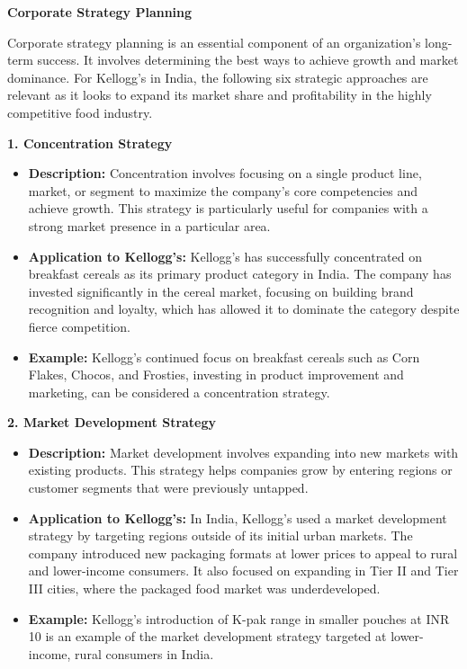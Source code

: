 \documentclass[10pt,a4paper]{book}
\begin{document}
\vspace{0.5cm}

\begin{center}
\textbf{Corporate Strategy Planning}
\end{center}

Corporate strategy planning is an essential component of an organization’s long-term success. It involves determining the best ways to achieve growth and market dominance. For Kellogg's in India, the following six strategic approaches are relevant as it looks to expand its market share and profitability in the highly competitive food industry.

\vspace{0.5cm}

\textbf{1. Concentration Strategy}
\begin{itemize}
    \item \textbf{Description:} Concentration involves focusing on a single product line, market, or segment to maximize the company’s core competencies and achieve growth. This strategy is particularly useful for companies with a strong market presence in a particular area.
    \item \textbf{Application to Kellogg's:} Kellogg's has successfully concentrated on breakfast cereals as its primary product category in India. The company has invested significantly in the cereal market, focusing on building brand recognition and loyalty, which has allowed it to dominate the category despite fierce competition.
    \item \textbf{Example:} Kellogg's continued focus on breakfast cereals such as Corn Flakes, Chocos, and Frosties, investing in product improvement and marketing, can be considered a concentration strategy.
\end{itemize}

\vspace{0.5cm}

\textbf{2. Market Development Strategy}
\begin{itemize}
    \item \textbf{Description:} Market development involves expanding into new markets with existing products. This strategy helps companies grow by entering regions or customer segments that were previously untapped.
    \item \textbf{Application to Kellogg's:} In India, Kellogg's used a market development strategy by targeting regions outside of its initial urban markets. The company introduced new packaging formats at lower prices to appeal to rural and lower-income consumers. It also focused on expanding in Tier II and Tier III cities, where the packaged food market was underdeveloped.
    \item \textbf{Example:} Kellogg's introduction of K-pak range in smaller pouches at INR 10 is an example of the market development strategy targeted at lower-income, rural consumers in India.
\end{itemize}
\end{document}
